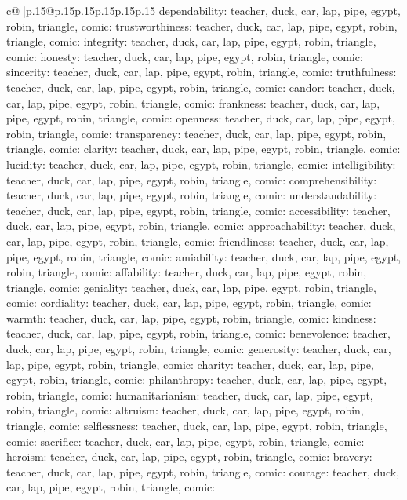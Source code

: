 \documentclass{article}
\begin{document}
{\begin{supertabular}{c@{$\;$}|p{.15\linewidth}@{}p{.15\linewidth}p{.15\linewidth}p{.15\linewidth}p{.15\linewidth}p{.15\linewidth}}
{{{dependability\nTARGETS: teacher, duck, car, lap, pipe, egypt, robin, triangle, comic\n\nCLUE: trustworthiness\nTARGETS: teacher, duck, car, lap, pipe, egypt, robin, triangle, comic\n\nCLUE: integrity\nTARGETS: teacher, duck, car, lap, pipe, egypt, robin, triangle, comic\n\nCLUE: honesty\nTARGETS: teacher, duck, car, lap, pipe, egypt, robin, triangle, comic\n\nCLUE: sincerity\nTARGETS: teacher, duck, car, lap, pipe, egypt, robin, triangle, comic\n\nCLUE: truthfulness\nTARGETS: teacher, duck, car, lap, pipe, egypt, robin, triangle, comic\n\nCLUE: candor\nTARGETS: teacher, duck, car, lap, pipe, egypt, robin, triangle, comic\n\nCLUE: frankness\nTARGETS: teacher, duck, car, lap, pipe, egypt, robin, triangle, comic\n\nCLUE: openness\nTARGETS: teacher, duck, car, lap, pipe, egypt, robin, triangle, comic\n\nCLUE: transparency\nTARGETS: teacher, duck, car, lap, pipe, egypt, robin, triangle, comic\n\nCLUE: clarity\nTARGETS: teacher, duck, car, lap, pipe, egypt, robin, triangle, comic\n\nCLUE: lucidity\nTARGETS: teacher, duck, car, lap, pipe, egypt, robin, triangle, comic\n\nCLUE: intelligibility\nTARGETS: teacher, duck, car, lap, pipe, egypt, robin, triangle, comic\n\nCLUE: comprehensibility\nTARGETS: teacher, duck, car, lap, pipe, egypt, robin, triangle, comic\n\nCLUE: understandability\nTARGETS: teacher, duck, car, lap, pipe, egypt, robin, triangle, comic\n\nCLUE: accessibility\nTARGETS: teacher, duck, car, lap, pipe, egypt, robin, triangle, comic\n\nCLUE: approachability\nTARGETS: teacher, duck, car, lap, pipe, egypt, robin, triangle, comic\n\nCLUE: friendliness\nTARGETS: teacher, duck, car, lap, pipe, egypt, robin, triangle, comic\n\nCLUE: amiability\nTARGETS: teacher, duck, car, lap, pipe, egypt, robin, triangle, comic\n\nCLUE: affability\nTARGETS: teacher, duck, car, lap, pipe, egypt, robin, triangle, comic\n\nCLUE: geniality\nTARGETS: teacher, duck, car, lap, pipe, egypt, robin, triangle, comic\n\nCLUE: cordiality\nTARGETS: teacher, duck, car, lap, pipe, egypt, robin, triangle, comic\n\nCLUE: warmth\nTARGETS: teacher, duck, car, lap, pipe, egypt, robin, triangle, comic\n\nCLUE: kindness\nTARGETS: teacher, duck, car, lap, pipe, egypt, robin, triangle, comic\n\nCLUE: benevolence\nTARGETS: teacher, duck, car, lap, pipe, egypt, robin, triangle, comic\n\nCLUE: generosity\nTARGETS: teacher, duck, car, lap, pipe, egypt, robin, triangle, comic\n\nCLUE: charity\nTARGETS: teacher, duck, car, lap, pipe, egypt, robin, triangle, comic\n\nCLUE: philanthropy\nTARGETS: teacher, duck, car, lap, pipe, egypt, robin, triangle, comic\n\nCLUE: humanitarianism\nTARGETS: teacher, duck, car, lap, pipe, egypt, robin, triangle, comic\n\nCLUE: altruism\nTARGETS: teacher, duck, car, lap, pipe, egypt, robin, triangle, comic\n\nCLUE: selflessness\nTARGETS: teacher, duck, car, lap, pipe, egypt, robin, triangle, comic\n\nCLUE: sacrifice\nTARGETS: teacher, duck, car, lap, pipe, egypt, robin, triangle, comic\n\nCLUE: heroism\nTARGETS: teacher, duck, car, lap, pipe, egypt, robin, triangle, comic\n\nCLUE: bravery\nTARGETS: teacher, duck, car, lap, pipe, egypt, robin, triangle, comic\n\nCLUE: courage\nTARGETS: teacher, duck, car, lap, pipe, egypt, robin, triangle, comic\n\nCLUE: }}}
\end{supertabular}}
\end{document}
